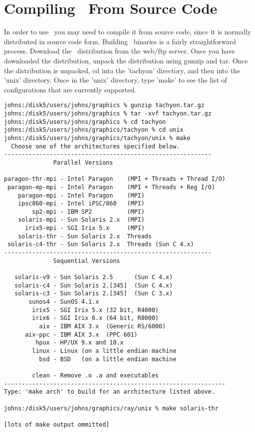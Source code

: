 \section{Compiling \RAY\ From Source Code}
  In order to use \RAY\, you may need to compile it from source 
code, since it is normally distributed in source code form.
Building \RAY\ binaries is a fairly straightforward process.  
Download the \RAY\ distribution from the web/ftp server.  Once you 
have downloaded the distribution, unpack the distribution using 
gunzip and tar.  Once the distribution is unpacked, cd into the 
'tachyon' directory, and then into the 'unix' directory.  
Once in the 'unix' directory, type 'make' to see the list of 
configurations that are currently supported.  

\begin{verbatim}
johns:/disk5/users/johns/graphics % gunzip tachyon.tar.gz
johns:/disk5/users/johns/graphics % tar -xvf tachyon.tar.gz
johns:/disk5/users/johns/graphics % cd tachyon
johns:/disk5/users/johns/graphics/tachyon % cd unix
johns:/disk5/users/johns/graphics/tachyon/unix % make
  Choose one of the architectures specified below.
-----------------------------------------------------------
              Parallel Versions        
 
paragon-thr-mpi - Intel Paragon    (MPI + Threads + Thread I/O) 
 paragon-mp-mpi - Intel Paragon    (MPI + Threads + Reg I/O)    
    paragon-mpi - Intel Paragon    (MPI)           
    ipsc860-mpi - Intel iPSC/860   (MPI)           
        sp2-mpi - IBM SP2          (MPI)           
    solaris-mpi - Sun Solaris 2.x  (MPI)           
      irix5-mpi - SGI Irix 5.x     (MPI)           
    solaris-thr - Sun Solaris 2.x  Threads       
 solaris-c4-thr - Sun Solaris 2.x  Threads (Sun C 4.x)     
-----------------------------------------------------------
              Sequential Versions        
 
   solaris-v9 - Sun Solaris 2.5      (Sun C 4.x)     
   solaris-c4 - Sun Solaris 2.[345]  (Sun C 4.x)     
   solaris-c3 - Sun Solaris 2.[345]  (Sun C 3.x)     
       sunos4 - SunOS 4.1.x                    
        irix5 - SGI Irix 5.x (32 bit, R4000)   
        irix6 - SGI Irix 6.x (64 bit, R8000)   
          aix - IBM AIX 3.x  (Generic RS/6000) 
      aix-ppc - IBM AIX 3.x  (PPC 601)         
         hpux - HP/UX 9.x and 10.x             
        linux - Linux (on a little endian machine 
          bsd - BSD   (on a little endian machine 
 
        clean - Remove .o .a and executables
---------------------------------------------------------------
Type: 'make arch' to build for an architecture listed above.

johns:/disk5/users/johns/graphics/ray/unix % make solaris-thr

[lots of make output ommitted]

\end{verbatim}


